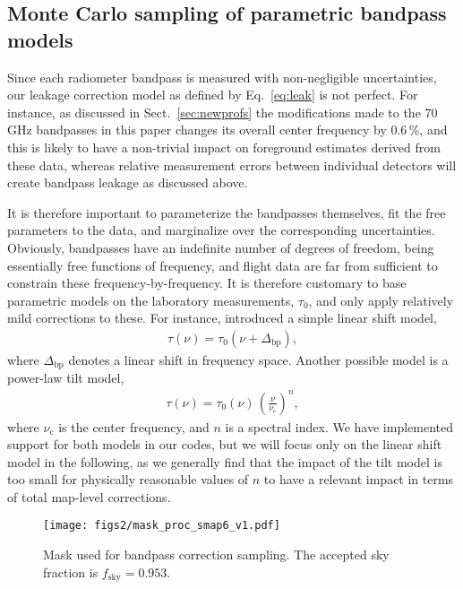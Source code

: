 \documentclass[twocolumn]{aa}
\newcommand{\Dbp}[0]{\Delta_{\mathrm{bp}}}
\newcommand{\?}[1]{\textcolor{red}{{\bf [#1]}}}
\begin{document}
\subsection{Monte Carlo sampling of parametric bandpass models}
Since each radiometer bandpass is measured with
non-negligible uncertainties, our leakage correction model as defined
by Eq.~\eqref{eq:leak} is not perfect. For instance, as discussed in
Sect.~\ref{sec:newprofs} the modifications made to the 70\,GHz
bandpasses in this paper changes its overall center frequency by
0.6\,\%, and this is likely to have a non-trivial impact on foreground
estimates derived from these data, whereas relative measurement errors
between individual detectors will create bandpass leakage as discussed
above.

It is therefore important to parameterize the bandpasses themselves, fit the
free parameters to the data, and marginalize over the corresponding
uncertainties. Obviously, bandpasses have an indefinite number of degrees of
freedom, being essentially free functions of frequency, and flight data are far
from sufficient to constrain these frequency-by-frequency. It is therefore
customary to base parametric models on the laboratory measurements, $\tau_0$,
and only apply relatively mild corrections to these. For instance,
\citet{planck2014-a12} introduced a simple linear shift model,
\begin{align}
  \tau(\nu) = \tau_0(\nu+\Dbp),
  \label{eq:bpshift}
\end{align}
where $\Dbp$ denotes a linear shift in frequency space. Another
possible model is a power-law tilt model,
\begin{align}
  \tau(\nu) = \tau_0(\nu)\,\left(\frac{\nu}{\nu_\mathrm{c}}\right)^n,
  \label{eq:bpshift2}
\end{align}
where $\nu_{\mathrm{c}}$ is the center frequency, and $n$ is a
spectral index. We have implemented support for both models in our
codes, but we will focus only on the linear shift model in the
following, as we generally find that the impact of the tilt model is
too small for physically reasonable values of $n$ to have a relevant impact in terms of total map-level corrections.

\begin{figure}[t]
  \center
  \texttt{[image: figs2/mask\_proc\_smap6\_v1.pdf]}
  \caption{Mask used for bandpass correction sampling. The accepted
    sky fraction is $f_{\mathrm{sky}}=0.953$.}
  \label{fig:procmask}
\end{figure}
\end{document}
